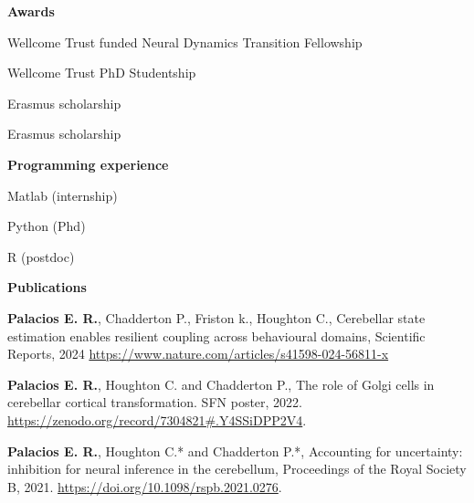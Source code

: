 \documentclass[11pt,usenames, dvipsnames]{article}
\begin{document}
\newpage
\vspace*{1cm}

{\large \bfseries \color{color_64493} Awards}\newline
\vspace{1pt}

 Wellcome Trust funded Neural Dynamics Transition Fellowship
\vspace{7pt}

 Wellcome Trust PhD Studentship
\vspace{7pt}

 Erasmus scholarship
\vspace{7pt}

 Erasmus scholarship
\vspace{7pt}

\vspace{1cm}

{\large \bfseries \color{color_64493} Programming experience}
\vspace{10pt}

Matlab (internship)
\vspace{7pt}

Python (Phd)
\vspace{7pt}

R (postdoc)

\vspace{1cm}

{\large \bfseries \color{color_64493} Publications}
\vspace{10pt}

{\bfseries Palacios E. R.}, Chadderton P., Friston k., Houghton C., Cerebellar state estimation enables resilient coupling
        across behavioural domains, Scientific Reports, 2024 \url{https://www.nature.com/articles/s41598-024-56811-x}
\vspace{7pt}

{\bfseries Palacios E. R.}, Houghton C. and Chadderton P., The role of Golgi cells in cerebellar cortical transformation. 
        SFN poster, 2022. \url{https://zenodo.org/record/7304821#.Y4SSiDPP2V4}.
\vspace{7pt}

{\bfseries Palacios E. R.}, Houghton C.* and Chadderton P.*, Accounting for uncertainty: inhibition for neural inference in
        the cerebellum, Proceedings of the Royal Society B, 2021. \url{https://doi.org/10.1098/rspb.2021.0276}.
\vspace{7pt}
\end{document}
